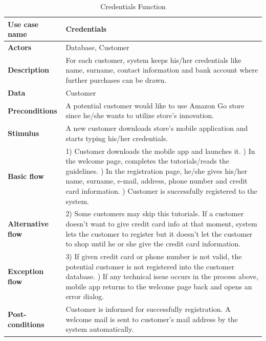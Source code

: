 \begin{table}[H]
     \centering
     \begin{tabular}{ | l | p{10cm} |}
     \hline
     \textbf{Use case name}    & Credentials \\
     \hline
     \textbf{Actors}           & Database, Customer \\
     \hline
     \textbf{Description}      & For each customer, system keeps his/her credentials like name, surname, contact information and bank account where further purchases can be drawn. \\
     \hline
     \textbf{Data}             & Customer \\
     \hline
     \textbf{Preconditions}    & A potential customer would like to use Amazon Go store since he/she wants to utilize store's innovation. \\
     \hline
     \textbf{Stimulus}         & A new customer downloads store's mobile application and starts typing his/her credentials. \\
     \hline
     \textbf{Basic flow}       & 1) Customer downloads the mobile app and launches it. \newline 2) In the welcome page, completes the tutorials/reads the guidelines.  \newline 3) In the registration page, he/she gives his/her name, surname, e-mail, address, phone number and credit card information. \newline 4) Customer is successfully registered to the system. \\
     \hline
     \textbf{Alternative flow} & 2) Some customers may skip this tutorials. \newline If a customer doesn't want to give credit card info at that moment, system lets the customer to register but it doesn't let the customer to shop until he or she give the credit card information. \\
     \hline
     \textbf{Exception flow}   & 3) If given credit card or phone number is not valid, the potential customer is not registered into the customer database. \newline 4) If any technical issue occurs in the process above, mobile app returns to the welcome page back and opens an error dialog. \\
     \hline
     \textbf{Post-conditions}  & Customer is informed for successfully registration. A welcome mail is sent to customer's mail address by the system automatically. \\
     \hline
     \end{tabular} \caption{Credentials Function}
     \label{tab:08credentials}
 \end{table}

